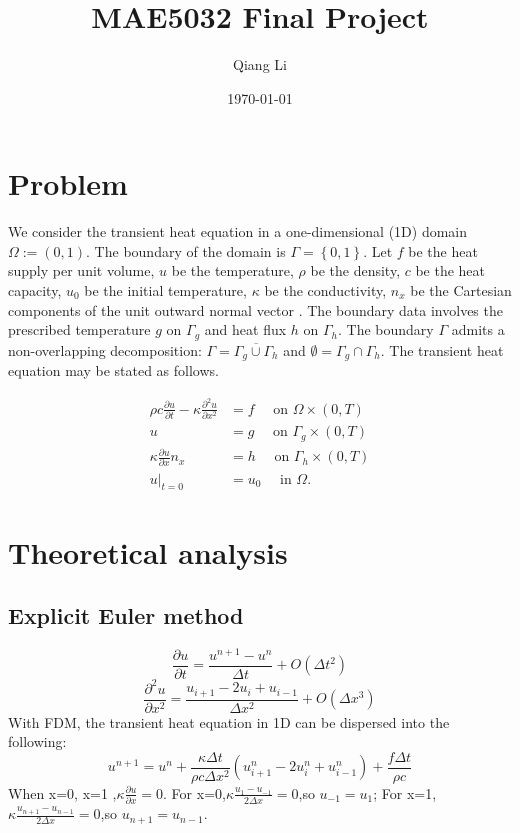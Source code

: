 \documentclass[12pt]{article}
\begin{document}
\title{\bf MAE5032 Final Project}
\author{Qiang Li}
\date{\today}
\maketitle

\section*{Problem}
We consider the transient heat equation in a one-dimensional (1D) domain $\Omega := (0,1)$. The boundary of the domain is $\Gamma = \left\lbrace 0, 1 \right\rbrace$.
Let $f$ be the heat supply per unit volume, $u$ be the temperature,  $\rho$ be the density, $c$ be the heat capacity, $u_0$ be the initial temperature, $\kappa$ be the conductivity, $n_x$ be the Cartesian components of the unit outward normal vector . The boundary data involves the prescribed temperature $g$ on $\Gamma_g$ and heat flux $h$ on $\Gamma_h$. The boundary $\Gamma$ admits a non-overlapping decomposition: $\Gamma = \overline{\Gamma_{g} \cup \Gamma_h}$ and $\emptyset = \Gamma_g \cap \Gamma_h$. The transient heat equation may be stated as follows.

\begin{align*}
\rho c \frac{\partial u}{\partial t} - \kappa  \frac{\partial^2 u}{\partial x^2} &= f \quad \mbox{ on } \Omega \times (0,T) \\
u &= g \quad \mbox{ on } \Gamma_{g} \times (0,T) \\
\kappa \frac{\partial u}{\partial x} n_{x}  &= h \quad \mbox{ on } \Gamma_h \times (0,T) \\
u|_{t=0} &= u_0 \quad \mbox{ in } \Omega.
\end{align*}

\section*{Theoretical analysis}
\subsection*{Explicit Euler method}
\begin{equation}
    \frac{\partial u}{\partial t}=\frac{u^{n+1}-u^n}{\Delta t}+O(\Delta t^2)\label{partial time}
\end{equation}
\begin{equation}
    \frac{\partial^2 u}{\partial x^2}=\frac{u_{i+1}-2u_i+u_{i-1}}{\Delta x^2}+O(\Delta x^3)\label{partial u}
\end{equation}
With FDM, the transient heat equation in 1D can be dispersed into the following:
\begin{equation}
    u^{n+1}=u^n+\frac{\kappa\Delta t}{\rho c\Delta x^2}(u_{i+1}^n-2u_i^n+u_{i-1}^n)+\frac{f\Delta t}{\rho c}
\end{equation}
When  x=0, x=1 ,$\kappa\frac{\partial u}{\partial x}=0$.
For x=0,$\kappa\frac{u_1-u_{-1}}{2\Delta x}=0$,so $u_{-1}=u_1$;
For x=1,$\kappa\frac{u_{n+1}-u_{n-1}}{2\Delta x}=0$,so $u_{n+1}=u_{n-1}$.
\end{document}
